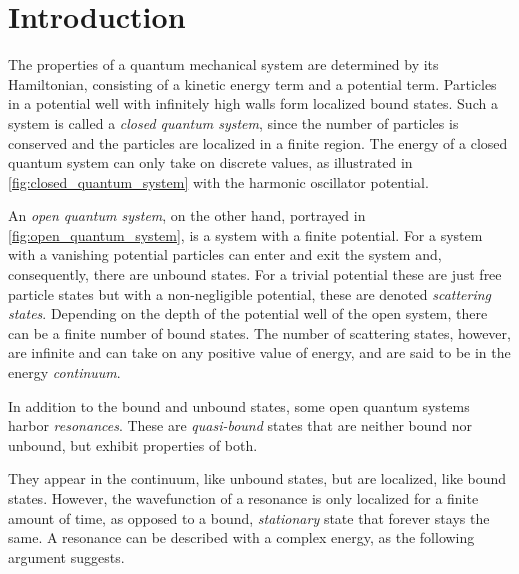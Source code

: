 \documentclass[../main/report.tex]{subfiles}
\begin{document}
\chapter{Introduction}
\label{cha:introduction}

The properties of a quantum mechanical system are determined by its Hamiltonian, consisting of a kinetic energy term and a potential term.
Particles in a potential well with infinitely high walls form localized bound states.
Such a system is called a \emph{closed quantum system}, since the number of particles is conserved and the particles are localized in a finite region. 
The energy of a closed quantum system can only take on discrete values, as illustrated in \cref{fig:closed_quantum_system} with the harmonic oscillator potential.

An \emph{open quantum system}, on the other hand, portrayed in \cref{fig:open_quantum_system}, is a system with a finite potential.
For a system with a vanishing potential particles can enter and exit the system and, consequently, there are unbound states. 
For a trivial potential these are just free particle states but with a non-negligible potential, these are denoted \emph{scattering states}.
Depending on the depth of the potential well of the open system, there can be a finite number of bound states.
The number of scattering states, however, are infinite and can take on any positive value of energy, and are said to be in the energy \emph{continuum}.

In addition to the bound and unbound states, some open quantum systems harbor \emph{resonances}. 
These are \emph{quasi-bound} states that are neither bound nor unbound, but exhibit properties of both. 

They appear in the continuum, like unbound states, but are localized, like bound states.
However, the wavefunction of a resonance is only localized for a finite amount of time, as opposed to a bound, \emph{stationary} state that forever stays the same.
A resonance can be described with a complex energy, as the following argument suggests.
\end{document}

